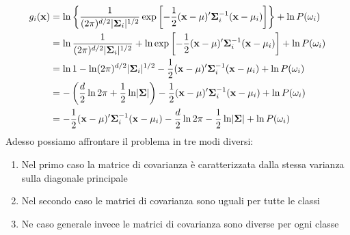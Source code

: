 \begin{equation}\label{fun}
\begin{split}
g_i(\mathbf{x}) &= 
\ln \left \{  
\frac{1}{(2\pi)^{d/2} \lvert\mathbf{\Sigma}_i\rvert^{1/2}} \exp \left [ - \frac{1}{2} (\mathbf{x} - \mathbf{\mu})'  \mathbf{\Sigma}_i^{-1} (\mathbf{x} - \mathbf{\mu}_i) \right ]  
\right \}
+ \ln P(\omega_i) \\
&= \ln \frac{1}{(2\pi)^{d/2} \lvert\mathbf{\Sigma}_i\rvert^{1/2}} + \ln \exp \left [ - \frac{1}{2} (\mathbf{x} - \mathbf{\mu})'  \mathbf{\Sigma}_i^{-1} (\mathbf{x} - \mathbf{\mu}_i) \right ] + \ln P(\omega_i)\\
&= \ln 1 - \ln (2\pi)^{d/2} \lvert\mathbf{\Sigma}_i\rvert^{1/2} - \frac{1}{2} (\mathbf{x} - \mathbf{\mu})'  \mathbf{\Sigma}_i^{-1} (\mathbf{x} - \mathbf{\mu}_i) + \ln P(\omega_i)\\
&= - \left( \frac{d}{2} \ln 2\pi + \frac{1}{2} \ln \lvert\mathbf{\Sigma}\rvert \right) - \frac{1}{2} (\mathbf{x} - \mathbf{\mu})'  \mathbf{\Sigma}_i^{-1} (\mathbf{x} - \mathbf{\mu}_i) + \ln P(\omega_i)\\
&= - \frac{1}{2} (\mathbf{x} - \mathbf{\mu})'  \mathbf{\Sigma}_i^{-1} (\mathbf{x} - \mathbf{\mu}_i) - \frac{d}{2} \ln 2\pi - \frac{1}{2} \ln \lvert\mathbf{\Sigma}\rvert + \ln P(\omega_i) 
\end{split} 
\end{equation}
Adesso possiamo affrontare il problema in tre modi diversi:
\begin{enumerate}
\item Nel primo caso la matrice di covarianza è caratterizzata dalla stessa varianza sulla diagonale principale
\item Nel secondo caso le matrici di covarianza sono uguali per tutte le classi
\item Ne caso generale invece le matrici di covarianza sono diverse per ogni classe
\end{enumerate}

